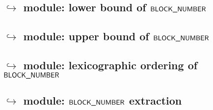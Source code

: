 \subsection{\blockHashMod{} $\hookrightarrow$ \wcpMod{} module: lower bound of $\textsf{BLOCK\_NUMBER}$}               \label{block hash: lookups: wcp: lower bound}                     
\subsection{\blockHashMod{} $\hookrightarrow$ \wcpMod{} module: upper bound of $\textsf{BLOCK\_NUMBER}$}               \label{block hash: lookups: wcp: upper bound}                     
\subsection{\blockHashMod{} $\hookrightarrow$ \wcpMod{} module: lexicographic ordering of $\textsf{BLOCK\_NUMBER}$}    \label{block hash: lookups: wcp: lexicographic ordering}          
\subsection{\blockHashMod{} $\hookrightarrow$ \btcMod{} module: $\textsf{BLOCK\_NUMBER}$ extraction}                   \label{block hash: lookups: block data: (block)number extraction} 
